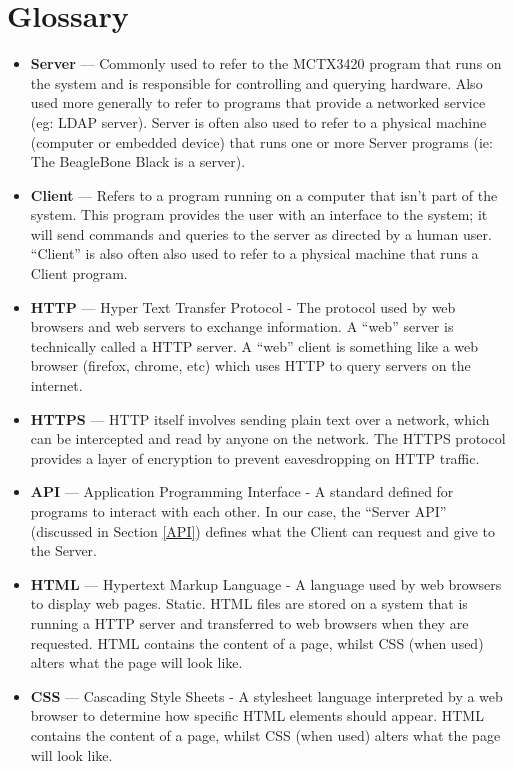 \section*{Glossary}

\begin{itemize}
	\item {\bf Server} --- Commonly used to refer to the MCTX3420 program that runs on the system and is responsible for controlling and querying hardware. Also used more generally to refer to programs that provide a networked service (eg: LDAP server). Server is often also used to refer to a physical machine (computer or embedded device) that runs one or more Server programs (ie: The BeagleBone Black is a server).
	\item {\bf Client} ---  Refers to a program running on a computer that isn't part of the system. This program provides the user with an interface to the system; it will send commands and queries to the server as directed by a human user. ``Client'' is also often also used to refer to a physical machine that runs a Client program.
	\item {\bf HTTP} --- Hyper Text Transfer Protocol - The protocol used by web browsers and web servers to exchange information. A ``web'' server is technically called a HTTP server. A ``web'' client is something like a web browser (firefox, chrome, etc) which uses HTTP to query servers on the internet.
	\item {\bf HTTPS} --- HTTP itself involves sending plain text over a network, which can be intercepted and read by anyone on the network. The HTTPS protocol provides a layer of encryption to prevent eavesdropping on HTTP traffic.
	\item {\bf API} --- Application Programming Interface - A standard defined for programs to interact with each other. In our case, the ``Server API'' (discussed in Section \ref{API}) defines what the Client can request and give to the Server.
	\item {\bf HTML} --- Hypertext Markup Language - A language used by web browsers to display web pages. Static. HTML files are stored on a system that is running a HTTP server and transferred to web browsers when they are requested. HTML contains the content of a page, whilst CSS (when used) alters what the page will look like.
	\item {\bf CSS} --- Cascading Style Sheets - A stylesheet language interpreted by a web browser to determine how specific HTML elements should appear. HTML contains the content of a page, whilst CSS (when used) alters what the page will look like.

\end{itemize}
